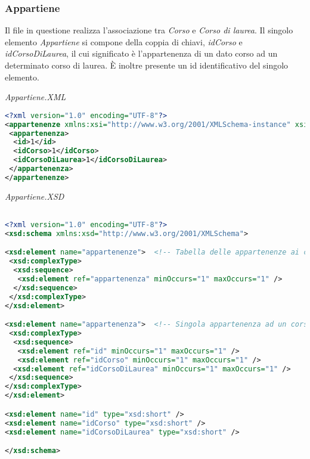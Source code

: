 \documentclass [a4paper,11pt]{book}
\begin{document}
\medskip

\subsubsection{Appartiene}

Il file in questione realizza l'associazione tra \emph{Corso} e \emph{Corso di laurea}. Il singolo elemento \emph{Appartiene} si compone della coppia di chiavi, \emph{idCorso} e \emph{idCorsoDiLaurea}, il cui significato è l'appartenenza di un dato corso ad un determinato corso di laurea. È inoltre presente un id identificativo del singolo elemento.

\medskip

\emph{Appartiene.XML}

\begin{lstlisting}[language=XML]
<?xml version="1.0" encoding="UTF-8"?>
<appartenenze xmlns:xsi="http://www.w3.org/2001/XMLSchema-instance" xsi:noNamespaceSchemaLocation="appartiene.xsd">
 <appartenenza>
  <id>1</id>
  <idCorso>1</idCorso>
  <idCorsoDiLaurea>1</idCorsoDiLaurea>
 </appartenenza>
</appartenenze>
\end{lstlisting}

\medskip

\emph{Appartiene.XSD}

\begin{lstlisting}[language=XML]

<?xml version="1.0" encoding="UTF-8"?>
<xsd:schema xmlns:xsd="http://www.w3.org/2001/XMLSchema">

<xsd:element name="appartenenze">  <!-- Tabella delle appartenenze ai corsi di laurea, da parte dei corsi -->
 <xsd:complexType> 
  <xsd:sequence>
   <xsd:element ref="appartenenza" minOccurs="1" maxOccurs="1" />
  </xsd:sequence>
 </xsd:complexType>
</xsd:element>

<xsd:element name="appartenenza">  <!-- Singola appartenenza ad un corso di laurea, da parte di un singolo corso -->
 <xsd:complexType> 
  <xsd:sequence>
   <xsd:element ref="id" minOccurs="1" maxOccurs="1" /> 
   <xsd:element ref="idCorso" minOccurs="1" maxOccurs="1" /> 
  <xsd:element ref="idCorsoDiLaurea" minOccurs="1" maxOccurs="1" /> 
 </xsd:sequence>
</xsd:complexType>
</xsd:element>

<xsd:element name="id" type="xsd:short" />
<xsd:element name="idCorso" type="xsd:short" />
<xsd:element name="idCorsoDiLaurea" type="xsd:short" />

</xsd:schema>
\end{lstlisting}
\end{document}
